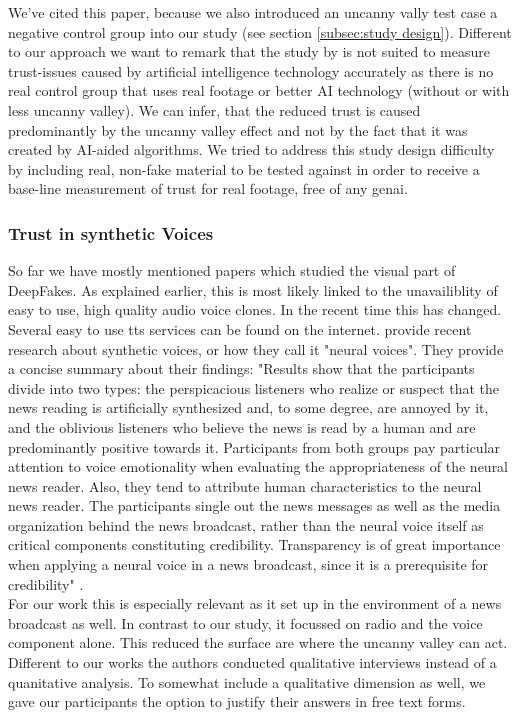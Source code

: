 \documentclass[
  a4paper,  %
  twoside,  %
  bibliography=totoc,
  headsepline,
  cleardoublepage=empty,
  parskip=half,
  draft=false
]{scrbook}
\begin{document}
We've cited this paper, because we also introduced an uncanny vally test case a negative control group into our study (see section \ref{subsec:study design}). Different to our approach we want to remark that the study by  is not suited to measure trust-issues caused by artificial intelligence technology accurately as there is no real control group that uses real footage or better AI technology (without or with less uncanny valley). We can infer, that the reduced trust is caused predominantly by the uncanny valley effect and not by the fact that it was created by AI-aided algorithms. We tried to address this study design difficulty by including real, non-fake material to be tested against in order to receive a base-line measurement of trust for real footage, free of any \gls{genai}.

\subsubsection*{Trust in synthetic Voices}
So far we have mostly mentioned papers which studied the visual part of DeepFakes. As explained earlier, this is most likely linked to the unavailiblity of easy to use, high quality audio voice clones. In the recent time this has changed. Several easy to use \gls{tts} services can be found on the internet.  provide recent research about synthetic voices, or how they call it "neural voices". They provide a concise summary about their findings: "Results show that the participants divide into two types: the perspicacious listeners who realize or suspect that the news reading is artificially synthesized and, to some degree, are annoyed by it, and the oblivious listeners who believe the news is read by a human and are predominantly positive towards it. Participants from both groups pay particular attention to voice emotionality when evaluating the appropriateness of the neural news reader. Also, they tend to attribute human characteristics to the neural news reader. The participants single out the news messages as well as the media organization behind the news broadcast, rather than the neural voice itself as critical components constituting credibility. Transparency is of great importance when applying a neural voice in a news broadcast, since it is a prerequisite for credibility" \cite{heiselbergAutomatedNewsReading2022}. \\
For our work this is especially relevant as it set up in the environment of a news broadcast as well. In contrast to our study, it focussed on radio and the voice component alone. This reduced the surface are where the uncanny valley can act. Different to our works the authors conducted qualitative interviews instead of a quanitative analysis. To somewhat include a qualitative dimension as well, we gave our participants the option to justify their answers in free text forms. 
\end{document}
